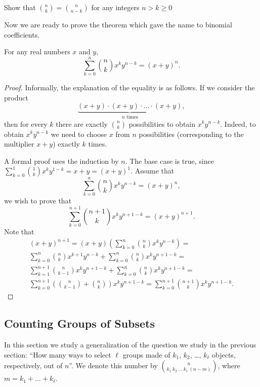 \begin{exercise}
  Show that $\binom{n}{k} = \binom{n}{n - k}$ for any integers $n > k \ge 0$
\end{exercise}


Now we are ready to prove the theorem which gave the name to binomial
coefficients.
\begin{theorem}
  For any real numbers $x$ and $y$,
    \[
      \sum_{k = 0}^n \binom{n}{k} x^k y^{n - k} = (x + y)^n.
    \]
\end{theorem}
\begin{proof}
  Informally, the explanation of the equality is as follows.
  If we consider the product
  \[
    \underbrace{(x + y) \cdot (x + y) \cdot
      \ldots \cdot (x + y)}_{n \text{ times}},
  \]
  then for every $k$ there are exactly $\binom{n}{k}$ possibilities to obtain
  $x^k y^{n - k}$. Indeed, to obtain $x^k y^{n - k}$ we need to choose $x$ from
  $n$ possibilities (corresponding to the multiplier $x + y$) exactly $k$ times.

  A formal proof uses the induction by $n$. The base case is
  true, since $\sum_{k = 0}^1 \binom{1}{k} x^k y^{1 - k} = x + y =
  (x + y)^1$. Assume that
  \[
    \sum_{k = 0}^n \binom{n}{k} x^k y^{n - k} = (x + y)^n,
  \]
  we wish to prove that
  \[
    \sum_{k = 0}^{n + 1} \binom{n + 1}{k} x^k y^{n + 1 - k} =
      (x + y)^{n + 1}.
  \]
  Note that
  \begin{multline*}
    (x + y)^{n + 1} = (x + y)
      \left(
        \sum_{k = 0}^n \binom{n}{k} x^k y^{n - k}
      \right) = \\
    \sum_{k = 0}^n \binom{n}{k} x^{k + 1} y^{n - k} +
      \sum_{k = 0}^n \binom{n}{k} x^{k} y^{n + 1 - k} = \\
    \sum_{k = 1}^{n + 1} \binom{n}{k - 1} x^k y^{n + 1 - k} +
      \sum_{k = 0}^n \binom{n}{k} x^k y^{n + 1 - k} = \\
    \sum_{k = 0}^{n + 1}
      \left(
        \binom{n}{k - 1} + \binom{n}{k}
      \right)
      x^k y^{n + 1 - k} =
    \sum_{k = 0}^{n + 1} \binom{n + 1}{k} x^k y^{n + 1 - k}.
  \end{multline*}
\end{proof}

\subsection{Counting Groups of Subsets}
In this section we study a generalization of the question we study in the
previous section: ``How many ways to select $\ell$ groups made of $k_1$, $k_2$,
\dots, $k_\ell$ objects, respectively, out of $n$''. We denote this number by
$\binom{n}{k_1 \ k_2 \ \dots \ k_\ell \  (n - m)}$, where
$m = k_1 + \dots + k_\ell$.

